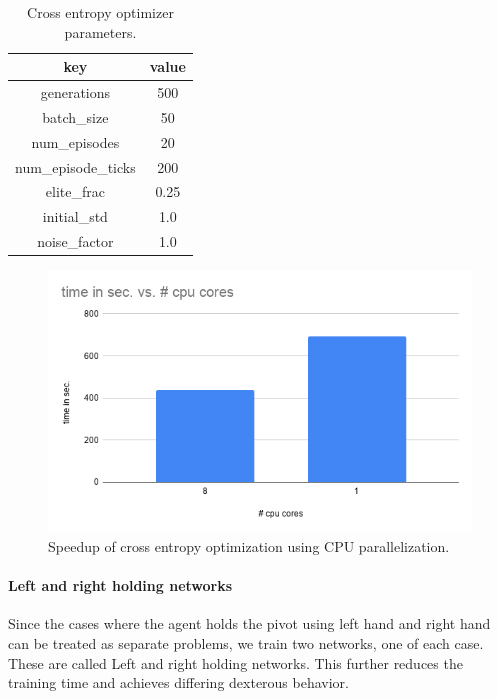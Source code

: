 \documentclass[12pt]{article}
\begin{document}
\begin{table}
\begin{center}
\begin{tabular}{ c c }
key & value \\
\hline
generations & 500 \\
batch\_size & 50 \\
num\_episodes & 20 \\
num\_episode\_ticks & 200 \\
elite\_frac & 0.25 \\
initial\_std & 1.0 \\
noise\_factor & 1.0 \\
\end{tabular}
\end{center}
\caption{Cross entropy optimizer parameters.}
\label{tab:ceo}
\end{table}

\begin{figure}[!htb]
\includegraphics[width=\linewidth]{figures/parallelization.png}
\endminipage\hfill
\caption{Speedup of cross entropy optimization using CPU parallelization.}
\label{fig:speedup}
\end{figure}

\paragraph{Left and right holding networks}
Since the cases where the agent holds the pivot using left hand and right hand can be treated as separate problems, we train two networks, one of each case.
These are called Left and right holding networks.
This further reduces the training time and achieves differing dexterous behavior.
\end{document}

